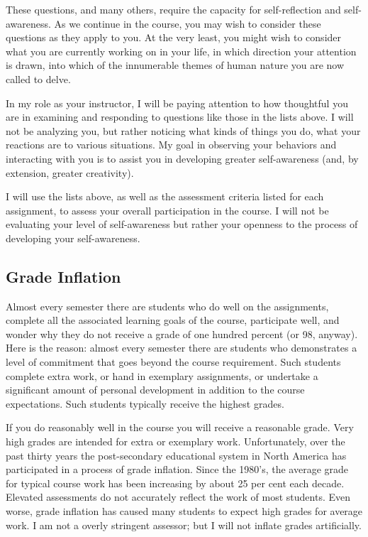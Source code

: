 \documentclass[letterpaper,10pt,headsepline]{scrreprt}
\begin{document}
These questions, and many others, require the capacity for self-reflection and self-awareness. As we continue in the course, you may wish to consider these questions as they apply to you. At the very least, you might wish to consider what you are currently working on in your life, in which direction your attention is drawn, into which of the innumerable themes of human nature you are now called to delve.

In my role as your instructor, I will be paying attention to how thoughtful you are in examining and responding to questions like those in the lists above. I will not be analyzing you, but rather noticing what kinds of things you do, what your reactions are to various situations. My goal in observing your behaviors and interacting with you is to assist you in developing greater self-awareness (and, by extension, greater creativity).

I will use the lists above, as well as the assessment criteria listed for each assignment, to assess your overall participation in the course. I will not be evaluating your level of self-awareness but rather your openness to the process of developing your self-awareness.

\subsection{Grade Inflation}
Almost every semester there are students who do well on the assignments, complete all the associated learning goals of the course,
participate well, and wonder why they do not receive a grade of one hundred percent (or 98, anyway). Here is the reason: almost every
semester there are students who demonstrates a level of commitment that goes beyond the course requirement. Such students complete extra
work, or hand in exemplary assignments, or undertake a significant amount of personal development in addition to the course expectations.
Such students typically receive the highest grades.

If you do reasonably well in the course you will receive a reasonable grade. Very high grades are intended for extra or exemplary work.
Unfortunately, over the past thirty years the post-secondary educational system in North America has participated in a process of
grade inflation. Since the 1980's, the average grade for typical course work has been increasing by about 25 per cent each decade.
Elevated assessments do not accurately reflect the work of most students. Even worse, grade inflation has caused many students to
expect high grades for average work. I am not a overly stringent assessor; but I will not inflate grades artificially.
\end{document}

